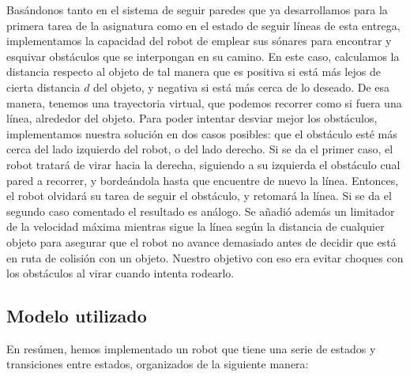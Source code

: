 \documentclass{article}
\begin{document}
Basándonos tanto en el sistema de seguir paredes que ya desarrollamos para la primera tarea de la asignatura como en el estado de seguir líneas de esta entrega, implementamos la capacidad del robot de emplear sus sónares para encontrar y esquivar obstáculos que se interpongan en su camino. En este caso, calculamos la distancia respecto al objeto de tal manera que es positiva si está más lejos de cierta distancia $d$ del objeto, y negativa si está más cerca de lo deseado. De esa manera, tenemos una trayectoria virtual, que podemos recorrer como si fuera una línea, alrededor del objeto. Para poder intentar desviar mejor los obstáculos, implementamos nuestra solución en dos casos posibles: que el obstáculo esté más cerca del lado izquierdo del robot, o del lado derecho. Si se da el primer caso, el robot tratará de virar hacia la derecha, siguiendo a su izquierda el obstáculo cual pared a recorrer, y bordeándola hasta que encuentre de nuevo la línea. Entonces, el robot olvidará su tarea de seguir el obstáculo, y retomará la línea. Si se da el segundo caso comentado el resultado es análogo. Se añadió además un limitador de la velocidad máxima mientras sigue la línea según la distancia de cualquier objeto para asegurar que el robot no avance demasiado antes de decidir que está en ruta de colisión con un objeto. Nuestro objetivo con eso era evitar choques con los obstáculos al virar cuando intenta rodearlo.

\subsection{Modelo utilizado}

En resúmen, hemos implementado un robot que tiene una serie de estados y transiciones entre estados, organizados de la siguiente manera:
\end{document}
